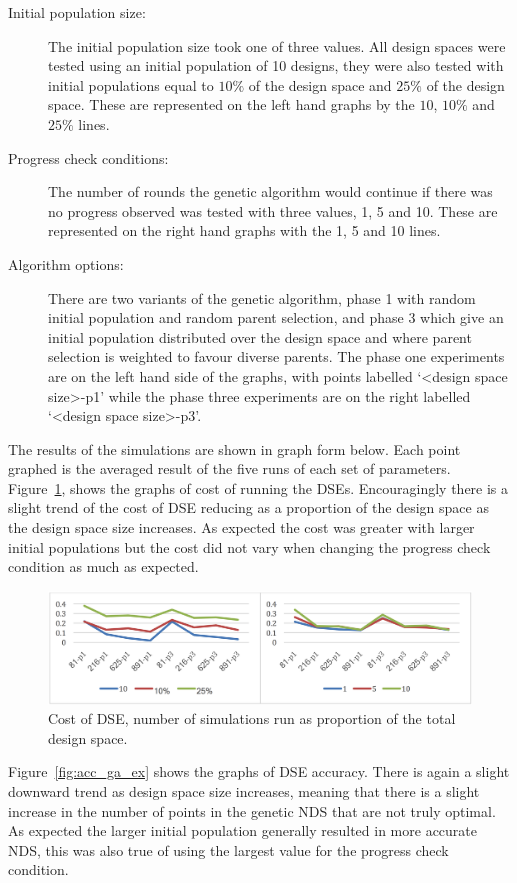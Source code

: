 \begin{description}
\item[Initial population size:] The initial population size took one of three values.  All design spaces were tested using an initial population of 10 designs, they were also tested with initial populations equal to $10\%$ of the design space and $25\%$ of the design space.  These are represented on the left hand graphs by the $10$, $10\%$ and $25\%$ lines.
\item[Progress check conditions:] The number of rounds the genetic algorithm would continue if there was no progress observed was tested with three values, 1, 5 and 10.  These are represented on the right hand graphs with the 1, 5 and 10 lines.

\item[Algorithm options:] There are two variants of the genetic algorithm, phase 1 with random initial population and random parent selection, and phase 3 which give an initial population distributed over the design space and where parent selection is weighted to favour diverse parents.  The phase one experiments are on the left hand side of the graphs, with points labelled `<design space size>-p1' while the phase three experiments are on the right labelled `<design space size>-p3'.
\end{description}

The results of the simulations are shown in graph form below.  Each point graphed is the averaged result of the five runs of each set of parameters.  Figure~\ref{fig:cost_ga_ex}, shows the graphs of cost of running the DSEs.  Encouragingly there is a slight trend of the cost of DSE reducing as a proportion of the design space as the design space size increases.  As expected the cost was greater with larger initial populations but the cost did not vary when changing the progress check condition as much as expected.

\begin{figure}[p]
	\centering
	\includegraphics[width=1\textwidth]{figures/ga_cost}
	\caption{Cost of DSE, number of simulations run as proportion of the total design space.}
	\label{fig:cost_ga_ex}
\end{figure}
Figure~\ref{fig:acc_ga_ex} shows the graphs of DSE accuracy.  There is again a slight downward trend as design space size increases, meaning that there is a slight increase in the number of points in the genetic NDS that are not truly optimal.  As expected the larger initial population generally resulted in more accurate NDS, this was also true of using the largest value for the progress check condition.


